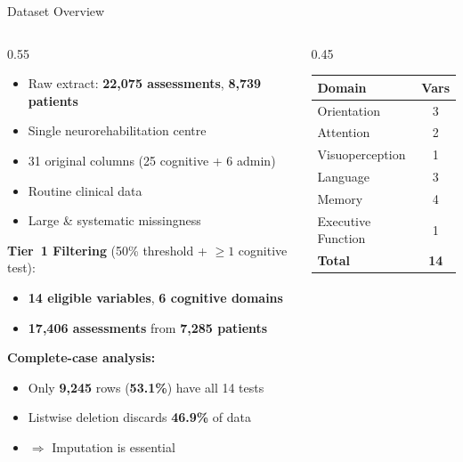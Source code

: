 \documentclass[aspectratio=169, 11pt]{beamer}
\begin{document}
\begin{frame}{Dataset Overview}
  \begin{columns}[T]
    \begin{column}{0.55\textwidth}
      \begin{itemize}
        \item Raw extract: \textbf{22,075 assessments}, \textbf{8,739 patients}
        \item Single neurorehabilitation centre
        \item 31 original columns (25 cognitive + 6 admin)
        \item Routine clinical data
        \item Large \& systematic missingness
      \end{itemize}

      \vspace{0.5em}
      \textbf{Tier~1 Filtering} (50\% threshold + $\geq 1$ cognitive test):
      \begin{itemize}
        \item \textbf{14 eligible variables}, \textbf{6 cognitive domains}
        \item \textbf{17,406 assessments} from \textbf{7,285 patients}
      \end{itemize}

      \vspace{0.5em}
      \textbf{Complete-case analysis:}
      \begin{itemize}
        \item Only \textbf{9,245} rows (\textbf{53.1\%}) have all 14 tests
        \item Listwise deletion discards \textbf{46.9\%} of data
        \item $\Rightarrow$ Imputation is essential
      \end{itemize}
    \end{column}
    \begin{column}{0.45\textwidth}
      \centering
      \small
      \begin{tabular}{l c}
        \toprule
        \textbf{Domain} & \textbf{Vars} \\
        \midrule
        Orientation        & 3 \\
        Attention          & 2 \\
        Visuoperception    & 1 \\
        Language           & 3 \\
        Memory             & 4 \\
        Executive Function & 1 \\
        \midrule
        \textbf{Total}     & \textbf{14} \\
        \bottomrule
      \end{tabular}
    \end{column}
  \end{columns}
\end{frame}
\end{document}
